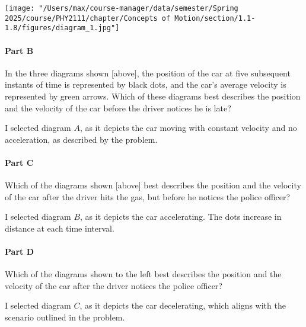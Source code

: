 \begin{center}
	\texttt{[image: "/Users/max/course-manager/data/semester/Spring 2025/course/PHY2111/chapter/Concepts of Motion/section/1.1-1.8/figures/diagram\_1.jpg"]}
\end{center}

\paragraph{Part B}
In the three diagrams shown [above], the position of the car at five subsequent instants of time is represented by black dots, and the car's average velocity is represented by green arrows. Which of these diagrams best describes the position and the velocity of the car before the driver notices he is late?

\vspace{1em}

\begin{solution}
	I selected diagram $A$, as it depicts the car moving with constant velocity and no acceleration, as described by the problem.
\end{solution}

\paragraph{Part C}
Which of the diagrams shown [above] best describes the position and the velocity of the car after the driver hits the gas, but before he notices the police officer?

\vspace{1em}

\begin{solution}
	I selected diagram $B$, as it depicts the car accelerating. The dots increase in distance at each time interval.
\end{solution}

\paragraph{Part D}
Which of the diagrams shown to the left best describes the position and the velocity of the car after the driver notices the police officer?

\vspace{1em}

\begin{solution}
	I selected diagram $C$, as it depicts the car decelerating, which aligns with the scenario outlined in the problem.
\end{solution}

